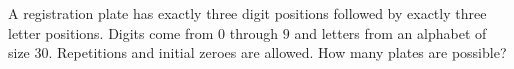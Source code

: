 A registration plate has exactly three digit positions followed by exactly three letter positions. Digits come from $0$ through $9$ and letters from an alphabet of size $30$. Repetitions and initial zeroes are allowed. How many plates are possible?
